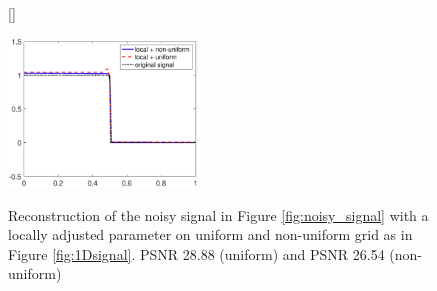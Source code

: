 \documentclass[enabledeprecatedfontcommands,cleardoublepage=empty,headsepline,twoside,11pt,DIV=15,BCOR=12mm,final]{scrartcl}
\begin{document}
\begin{figure}[h!]
\begin{center}
[\FBwidth]
{\caption{Reconstruction of the noisy signal in Figure \ref{fig:noisy_signal} with a locally adjusted parameter on uniform and non-uniform grid as in Figure \ref{fig:1Dsignal}. PSNR 28.88 (uniform) and PSNR 26.54 (non-uniform)}\label{fig:PSNR}}
{\includegraphics[width=5cm]{Comparison_uniform_nonuniform_mesh_average}}
\end{center}
\end{figure}

\end{document}
